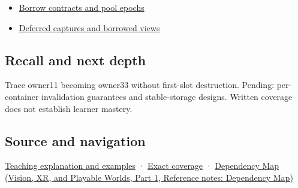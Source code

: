 \hypertarget{appendix-f9b8b9188c7f-used-by}{}

\begin{itemize}
\tightlist
\item
  \hyperref[appendix-aa405b7c3903]{Borrow contracts and pool epochs}
\item
  \hyperref[appendix-aea529eb5175]{Deferred captures and borrowed views}
\end{itemize}

\subsection{Recall and next depth}\label{appendix-f9b8b9188c7f-recall-and-next-depth}

\hypertarget{appendix-f9b8b9188c7f-recall-and-next-depth}{}

Trace owner11 becoming owner33 without first-slot destruction. Pending: per-container invalidation guarantees and stable-storage designs. Written coverage does not establish learner mastery.

\subsection{Source and navigation}\label{appendix-f9b8b9188c7f-source-and-navigation}

\hypertarget{appendix-f9b8b9188c7f-source-and-navigation}{}

\hyperref[01-foundations-i-ch003-when-a-valid-borrow-stops-naming-the-intended-thing]{Teaching explanation and examples} · \hyperref[appendix-fd090d982a15-m008---parts-113-126]{Exact coverage} · \href{../07-Vision-XR-and-Playable-Worlds-P01/main.pdf\#appendix-4ad47bdd269a}{Dependency Map (Vision, XR, and Playable Worlds, Part 1, Reference notes: Dependency Map)}
